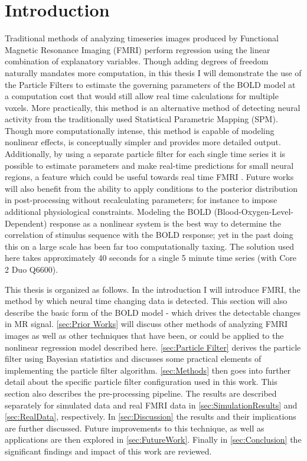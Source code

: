\chapter{Introduction}
Traditional methods of analyzing timeseries images produced by 
Functional Magnetic Resonance 
Imaging (FMRI) perform regression using the linear combination of explanatory variables. 
Though adding degrees of freedom naturally mandates more computation,
in this thesis I will demonstrate the use of the Particle Filters to 
estimate the governing parameters of the BOLD model at a computation cost 
that would still allow real time calculations for multiple voxels.
More practically, this method is an alternative
method of detecting neural activity from the traditionally
used Statistical Parametric Mapping (SPM). Though more computationally intense,
this method is capable of modeling nonlinear effects, is conceptually simpler
and provides more detailed output. Additionally,
by using a separate particle filter for each single time series it 
is possible to estimate parameters and make real-time predictions
for small neural regions, a feature which could be useful towards real time FMRI 
\cite{DeCharms2005}. Future works will also benefit from the ability to 
apply conditions to the posterior distribution in post-processing without
recalculating parameters; for instance to impose additional 
physiological
constraints. Modeling the BOLD (Blood-Oxygen-Level-Dependent) response 
as a nonlinear system is the
best way to determine the correlation of stimulus sequence with the BOLD
response; yet in the past doing this on a large scale has been far too
computationally taxing. The solution used here takes approximately 40 seconds
for a single 5 minute time series (with Core 2 Duo Q6600). 

This thesis is organized as follows. In the introduction I will introduce
FMRI, the method by which neural time changing data is detected. This section
will also describe the basic form of the BOLD model - which drives the 
detectable changes in MR signal. \autoref{sec:Prior Works} will discuss other
methods of analyzing FMRI images as well as other techniques that have
been, or could be applied to the nonlinear regression model described here. 
\autoref{sec:Particle Filter} derives the particle filter using Bayesian 
statistics and discusses some practical elements of implementing the 
particle filter algorithm. \autoref{sec:Methods} then goes into further
detail about the specific particle filter configuration used in this work.
This section also describes the pre-processing pipeline. 
The results are described separately for simulated data
and real FMRI data in \autoref{sec:SimulationResults} and \autoref{sec:RealData},
respectively. In \autoref{sec:Discussion} the results and their implications
are further discussed. Future improvements to this technique, as well
as applications are then explored in \autoref{sec:FutureWork}.
Finally in \autoref{sec:Conclusion} the significant findings and 
impact of this work are reviewed. 

